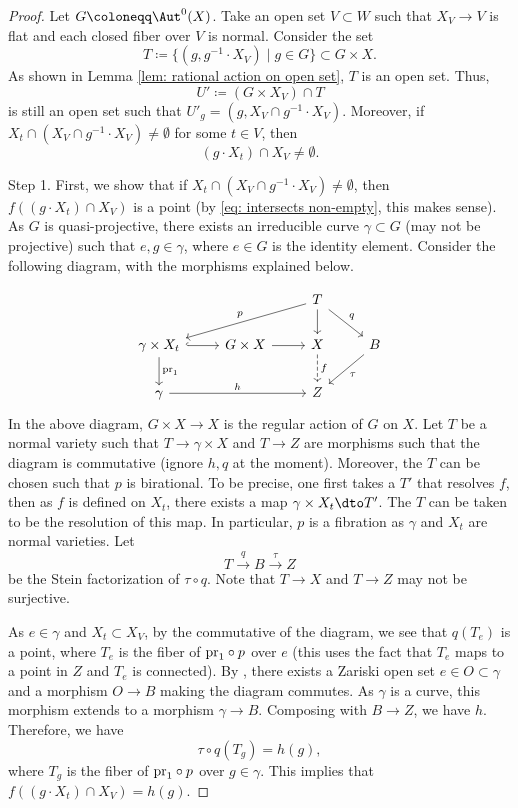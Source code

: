 \documentclass[11pt]{amsart}
\begin{document}
\begin{proof}
Let $G \coloneqq \Aut^0(X)$. Take an open set $V \subset W$ such that $X_{V} \to V$ is flat and each closed fiber over $V$ is normal. Consider the set 
\[
T \coloneqq \{(g, g^{-1}\cdot X_{V}) \mid g\in G\} \subset  G \times X.
\] As shown in Lemma \ref{lem: rational action on open set}, $T$ is an open set. Thus,
\[
U' \coloneqq (G \times X_{V}) \cap T
\] is still an open set such that $U'_g = (g, X_{V} \cap g^{-1}\cdot X_{V})$. Moreover, if $X_t \cap (X_{V} \cap g^{-1}\cdot X_{V}) \neq \emptyset$ for some $t\in V$, then 
\begin{equation}\label{eq: intersects non-empty}
(g\cdot X_t) \cap X_{V} \neq \emptyset.
\end{equation}   

\medskip

Step 1. First, we show that if $X_t \cap (X_{V} \cap g^{-1}\cdot X_{V}) \neq \emptyset$, then $f((g\cdot X_t) \cap X_{V})$ is a point (by \eqref{eq: intersects non-empty}, this makes sense). As $G$ is quasi-projective, there exists an irreducible curve $\gamma \subset G$ (may not be projective) such that $e, g \in \gamma$, where $e\in G$ is the identity element. Consider the following diagram, with the morphisms explained below.

  \[
    \begin{tikzcd}
    &&T \arrow{lld}[swap]{p}\arrow{d} \arrow{rd}{q}&\\
    \gamma \times X_t \arrow[hook]{r}\arrow{d}{{\rm pr}_1} & G \times X \arrow{r}& X \arrow[dashed]{d}{f}& B \arrow{ld}{\tau}\\
    \gamma \arrow{rr}{h}&&Z &
    \end{tikzcd}
    \] In the above diagram, $G \times X \to X$ is the regular action of $G$ on $X$. Let $T$ be a normal variety such that $T \to \gamma \times X$ and $T \to Z$ are morphisms such that the diagram is commutative (ignore $h, q$ at the moment). Moreover, the $T$ can be chosen such that $p$ is birational. To be precise, one first takes a $T'$ that resolves $f$, then as $f$ is defined on $X_t$, there exists a map $\gamma \times X_t \dto T'$. The $T$ can be taken to be the resolution of this map. In particular, $p$ is a fibration as $\gamma$ and $X_t$ are normal varieties. Let 
    \[
    T \xrightarrow{q} B \xrightarrow{\tau} Z
    \] be the Stein factorization of $\tau\circ q$. Note that $T \to X$ and $T \to Z$ may not be surjective.
    
    
    As $e \in \gamma$ and $X_t \subset X_V$, by the commutative of the diagram, we see that $q(T_e)$ is a point, where $T_e$ is the fiber of ${\rm pr}_1 \circ p$ over $e$ (this uses the fact that $T_e$ maps to a point in $Z$ and $T_e$ is connected). By \cite[Lemma 1.15 (a)]{Deb01}, there exists a Zariski open set $e\in O \subset \gamma$ and a morphism $O \to B$ making the diagram commutes. As $\gamma$ is a curve, this morphism extends to a morphism $\gamma \to B$. Composing with $B \to Z$, we have $h$. Therefore, we have
    \[
    \tau\circ q(T_g)=h(g),
    \] where $T_g$ is the fiber of ${\rm pr}_1\circ  p$ over $g\in \gamma$. 
    This implies that $f((g\cdot X_t) \cap X_{V})=h(g)$.


\end{proof}
\end{document}
